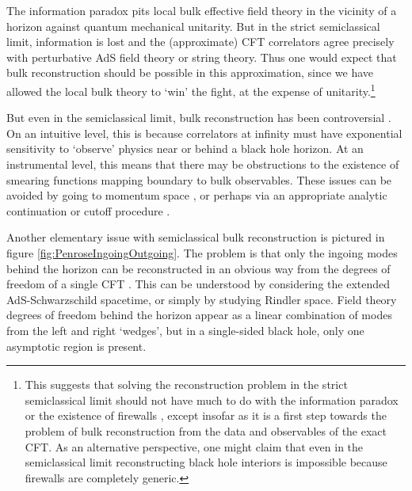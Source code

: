 \documentclass[12pt]{article}
\numberwithin{equation}{section}
\begin{document}
The information paradox pits local bulk effective field theory in the vicinity of a horizon against quantum mechanical unitarity.  But in the strict semiclassical limit, information is lost and the (approximate) CFT correlators agree precisely with perturbative  AdS field theory or string theory.  Thus one would expect that bulk reconstruction should be possible in this approximation, since we have allowed the local bulk theory to `win' the fight, at the expense of unitarity.\footnote{This suggests that solving the reconstruction problem in the strict semiclassical limit should not have much to do with the information paradox or the existence of firewalls \cite{Almheiri:2012rt}, except insofar as it is a first step towards the problem of bulk reconstruction from the data and observables of the exact CFT.  As an alternative perspective, one might claim that even in the semiclassical limit reconstructing black hole interiors is impossible because firewalls are completely generic.}  

But even in the semiclassical limit, bulk reconstruction has been controversial \cite{Hamilton:2005ju, Bousso:2012mh, Leichenauer:2013kaa, Morrison:2014jha}.  On an intuitive level, this is because correlators at infinity must have exponential sensitivity to `observe' physics near or behind a black hole horizon.  At an instrumental level, this means that there may be obstructions to the existence of smearing functions mapping boundary to bulk observables.  These issues can be avoided by going to momentum space \cite{Papadodimas:2012aq, Papadodimas:2013jku}, or perhaps via an appropriate analytic continuation \cite{Hamilton:2005ju} or cutoff procedure \cite{Morrison:2014jha}.

Another elementary issue with semiclassical bulk reconstruction is  pictured in figure \ref{fig:PenroseIngoingOutgoing}.  The problem is that only the ingoing modes behind the horizon can be reconstructed in an obvious way from the degrees of freedom of a single CFT \cite{Hamilton:2005ju}.  This can be understood by considering the extended AdS-Schwarzschild spacetime, or simply by studying  Rindler space.  Field theory degrees of freedom behind the horizon appear as a linear combination of modes from the left and right `wedges', but in a single-sided black hole, only one asymptotic region is present.  
\end{document}
